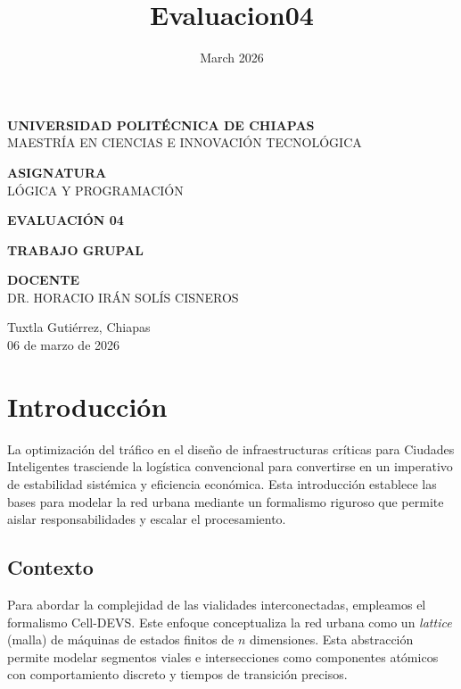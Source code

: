 \documentclass[12pt]{article}
\title{Evaluacion04}
\date{March 2026}
\begin{document}
\begin{titlepage}
\begin{center}

\vspace*{1.5cm}

{\Large \textbf{UNIVERSIDAD POLITÉCNICA DE CHIAPAS}}\\[0.4cm]
{\large MAESTRÍA EN CIENCIAS E INNOVACIÓN TECNOLÓGICA}

\vspace{2cm}

{\large \textbf{ASIGNATURA}}\\[0.2cm]
{\large LÓGICA Y PROGRAMACIÓN}

\vspace{1.8cm}

{\Large \textbf{EVALUACIÓN 04}}

\vspace{1.8cm}

{\large \textbf{TRABAJO GRUPAL}}\\[0.2cm]

\vspace{2cm}

{\large \textbf{DOCENTE}}\\[0.2cm]
{\large DR. HORACIO IRÁN SOLÍS CISNEROS}

\vfill

{\large Tuxtla Gutiérrez, Chiapas\\
06 de marzo de 2026}

\end{center}
\end{titlepage}

\section{Introducción}

La optimización del tráfico en el diseño de infraestructuras críticas para Ciudades Inteligentes trasciende la logística convencional para convertirse en un imperativo de estabilidad sistémica y eficiencia económica. Esta introducción establece las bases para modelar la red urbana mediante un formalismo riguroso que permite aislar responsabilidades y escalar el procesamiento.

\subsection{Contexto}

Para abordar la complejidad de las vialidades interconectadas, empleamos el formalismo Cell-DEVS. Este enfoque conceptualiza la red urbana como un \textit{lattice} (malla) de máquinas de estados finitos de $n$ dimensiones. Esta abstracción permite modelar segmentos viales e intersecciones como componentes atómicos con comportamiento discreto y tiempos de transición precisos.
\end{document}

